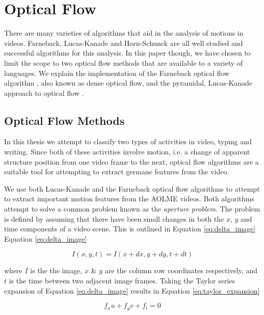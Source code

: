 \section{\label{section:optical_flow}Optical Flow}
There are many varieties of algorithms that aid in the analysis of motions in
videos.  Farneback, Lucas-Kanade and Horn-Schunck \cite{horn1981determining} are
all well studied and successful algorithms for this analysis. In this paper
though, we have chosen to limit the scope to two optical flow methods that are
available to a variety of languages. We explain the implementation of the
Farneback optical flow algorithm \cite{farneback2003two}, also known as dense
optical flow, and the pyramidal, Lucas-Kanade approach to optical flow
\cite{bouguet2001pyramidal}.

\subsection{\label{section:optical_flow_methods}Optical Flow Methods}
In this thesis we attempt to classify two types of activities in video,  typing
and writing. Since both of these activities involve motion, i.e. a change of
apparent structure position from one video frame to the next, optical flow
algorithms  are a suitable tool for attempting to extract germane features from
the video.

We use both Lucas-Kanade \cite{lucas1981iterative} and the Farneback
\cite{farneback2003two}  optical flow algorithms to attempt to extract
important motion features from the AOLME videos. Both algorithms attempt to solve
a common problem known as the \textit{aperture problem}. The problem is defined
by assuming that there have been small changes in both the $x$, $y$ and time components
of a video scene. This is outlined in Equation \ref{eq:delta_image}
Equation \ref{eq:delta_image}

\begin{equation}
I(x,y,t) = I(x+dx, y+dy, t+dt)
\label{eq:delta_image}
\end{equation}

where $I$ is the the image, $x$ \& $y$ are the column row coordinates
respectively, and $t$ is the time between two adjacent image frames. Taking the
Taylor series expansion of Equation \ref{eq:delta_image} results in Equation
\ref{eq:taylor_expansion}


\begin{equation}
f_x u + f_y v + f_t = 0
\label{eq:taylor_expansion}
\end{equation}

